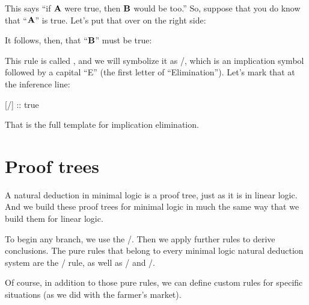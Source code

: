 \documentclass[../../../main.tex]{subfiles}
\begin{document}
\noindent
This says ``if $\mathbf{A}$ were true, then $\mathbf{B}$ would be too.'' So, suppose that you do know that ``$\mathbf{A}$'' is true. Let's put that over on the right side:

\begin{prooftree*}
  \hypo{}
  
  \hypo{}
  
\end{prooftree*}

\noindent
It follows, then, that ``$\mathbf{B}$'' must be true:

\begin{prooftree*}
  \hypo{}
  
  \hypo{}
  
\end{prooftree*}

\noindent
This rule is called , and we will symbolize it as \implElim/, which is an implication symbol followed by a capital ``E'' (the first letter of ``Elimination''). Let's mark that at the inference line:

\begin{prooftree*}
  \hypo{}
  \hypo{}
  [\implElim/]{ :: true}
\end{prooftree*}

\noindent
That is the full template for implication elimination.


\section{Proof trees}

A natural deduction  in minimal logic is a proof tree, just as it is in linear logic. And we build these proof trees for minimal logic in much the same way that we build them for linear logic.

To begin any branch, we use the \startrule/. Then we apply further rules to derive conclusions. The pure rules that belong to every minimal logic natural deduction system are the \startrule/ rule, as well as \implIntro/ and \implElim/. 

Of course, in addition to those pure rules, we can define custom rules for specific situations (as we did with the farmer's market).
\end{document}
